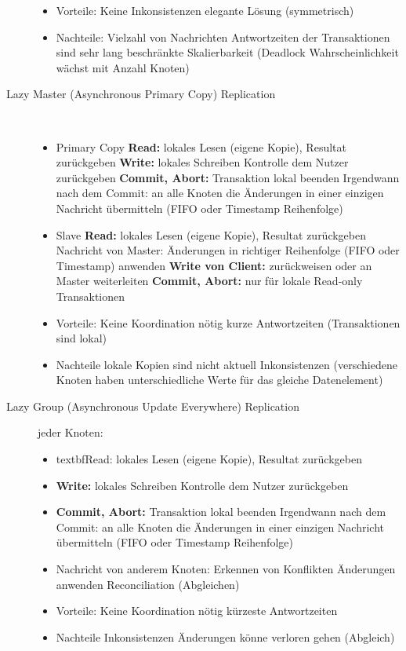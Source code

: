 \documentclass[a4paper,10pt,titlepage=false]{scrreprt}
\begin{document}
\begin{description}
\begin{itemize}
\item Vorteile:
\subitem Keine Inkonsistenzen
\subitem elegante Lösung (symmetrisch)
\item Nachteile:
\subitem Vielzahl von Nachrichten
\subitem Antwortzeiten der Transaktionen sind sehr lang
\subitem beschränkte Skalierbarkeit (Deadlock
Wahrscheinlichkeit wächst mit Anzahl Knoten)
\end{itemize}
\item[Lazy Master (Asynchronous Primary Copy) Replication] \hfill \\
\begin{itemize}
  \item Primary Copy
\subitem \textbf{Read:} lokales Lesen (eigene Kopie), Resultat
zurückgeben
\subitem \textbf{Write:} lokales Schreiben Kontrolle dem Nutzer
zurückgeben
\subitem \textbf{Commit, Abort:} Transaktion lokal beenden
Irgendwann nach dem Commit: an alle Knoten die
Änderungen in einer einzigen Nachricht übermitteln
(FIFO oder Timestamp Reihenfolge)
\item Slave
\subitem \textbf{Read:} lokales Lesen (eigene Kopie), Resultat
zurückgeben
\subitem Nachricht von Master: Änderungen in richtiger
Reihenfolge (FIFO oder Timestamp) anwenden
\subitem \textbf{Write von Client:} zurückweisen oder an Master
weiterleiten
\subitem \textbf{Commit, Abort:} nur für lokale Read-only Transaktionen
\item Vorteile:
\subitem Keine Koordination nötig
\subitem kurze Antwortzeiten (Transaktionen sind lokal)
\item Nachteile
\subitem lokale Kopien sind nicht aktuell
\subitem Inkonsistenzen (verschiedene Knoten haben
unterschiedliche Werte für das gleiche Datenelement)
\end{itemize}
\item[Lazy Group (Asynchronous Update Everywhere) Replication] jeder Knoten:
\begin{itemize}
\item textbf{Read:} lokales Lesen (eigene Kopie), Resultat
zurückgeben
\item \textbf{Write:} lokales Schreiben Kontrolle dem Nutzer
zurückgeben
\item \textbf{Commit, Abort:} Transaktion lokal beenden
Irgendwann nach dem Commit: an alle Knoten die
Änderungen in einer einzigen Nachricht übermitteln
(FIFO oder Timestamp Reihenfolge)
\item Nachricht von anderem Knoten:
\subitem Erkennen von Konflikten
\subitem Änderungen anwenden
\subitem Reconciliation (Abgleichen)
\item Vorteile:
\subitem Keine Koordination nötig
\subitem kürzeste Antwortzeiten
\item Nachteile
\subitem Inkonsistenzen
\subitem Änderungen könne verloren gehen (Abgleich)

\end{itemize}
\end{description}
\end{document}

